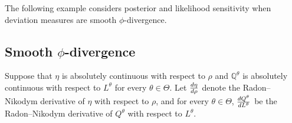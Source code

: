 \documentclass[10pt,a4paper]{amsart}
\numberwithin{equation}{section}
\numberwithin{theorem}{section}
\numberwithin{table}{section}
\numberwithin{figure}{section}
\begin{document}
The following example considers posterior and likelihood sensitivity when deviation measures are smooth $\phi$-divergence.

\subsection{Smooth $\phi$-divergence}
 \label{eg:phi_Bayes}
 

Suppose that $\eta$ is absolutely continuous with respect to $\rho$ and  ${\mathbb Q}^\theta$ is absolutely continuous with respect to $L^\theta$ for every $\theta\in\Theta$. Let $\frac{{\rm d} \eta}{{\rm d}\rho}$ denote the Radon--Nikodym derivative of $\eta$ with respect to $\rho$, and for every $\theta\in\Theta$, $\frac{{\rm d}Q^\theta}{{\rm d}L^\theta}$ be the Radon--Nikodym derivative of $Q^{\theta}$ with respect to $L^\theta$.
\end{document}
